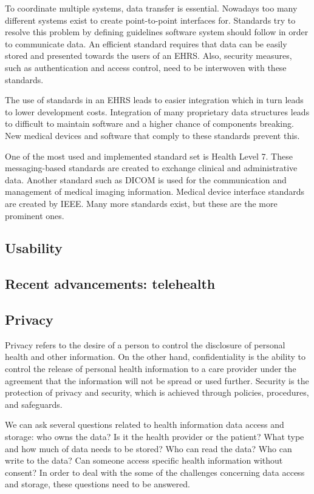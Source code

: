         To coordinate multiple systems, data transfer is essential. Nowadays too many different systems exist to create point-to-point interfaces for. Standards try to resolve this problem by defining guidelines software system should follow in order to communicate data. An efficient standard requires that data can be easily stored and presented towards the users of an EHRS\@. Also, security measures, such as authentication and access control, need to be interwoven with these standards.

        The use of standards in an EHRS leads to easier integration which in turn leads to lower development costs. Integration of many proprietary data structures leads to difficult to maintain software and a higher chance of components breaking. New medical devices and software that comply to these standards prevent this.

        One of the most used and implemented standard set is Health Level 7. These messaging-based standards are created to exchange clinical and administrative data. Another standard such as DICOM is used for the communication and management of medical imaging information\cite{Mildenberger2002}. Medical device interface standards are created by IEEE\@. Many more standards exist, but these are the more prominent ones.

    \subsection{Usability}\label{bg_usability}

    \subsection{Recent advancements: telehealth}

    \subsection{Privacy}\label{bg_privacy}

    Privacy refers to the desire of a person to control the disclosure of personal health and other information\cite{Shortliffe2014}. On the other hand, confidentiality is the ability to control the release of personal health information to a care provider under the agreement that the information will not be spread or used further. Security is the protection of privacy and security, which is achieved through policies, procedures, and safeguards. 

    We can ask several questions related to health information data access and storage: who owns the data? Is it the health provider or the patient? What type and how much of data needs to be stored? Who can read the data? Who can write to the data? Can someone access specific health information without consent? In order to deal with the some of the challenges concerning data access and storage, these questions need to be answered\cite{Meingast2006}.

